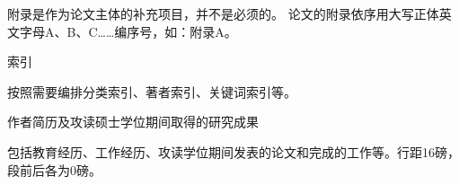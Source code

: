 \documentclass{bjtuthesis}
\begin{document}
\indent{}附录是作为论文主体的补充项目，并不是必须的。
论文的附录依序用大写正体英文字母A、B、C……编序号，如：附录A。
\cleardoublepage
\begin{center}
    {\heiti 索引}
\end{center}

\indent{}按照需要编排分类索引、著者索引、关键词索引等。
\cleardoublepage
\begin{thecenter}
    作者简历及攻读硕士学位期间取得的研究成果
\end{thecenter}

包括教育经历、工作经历、攻读学位期间发表的论文和完成的工作等。行距16磅，段前后各为0磅。
\cleardoublepage
\cstatement
\clastpage
\end{document}
